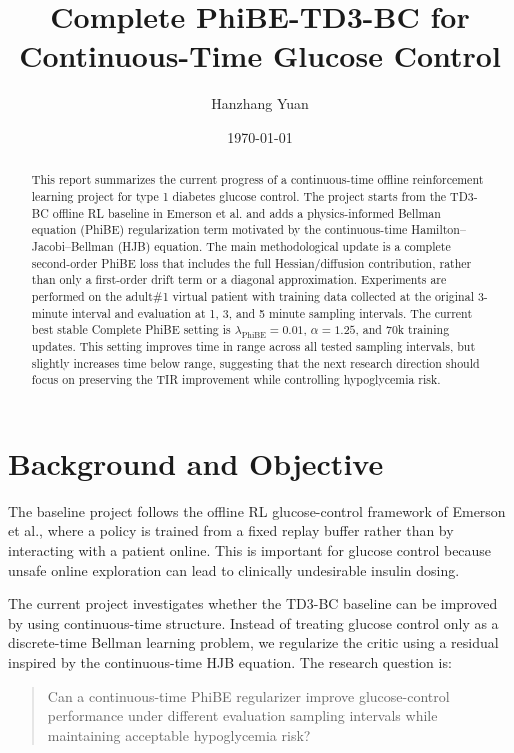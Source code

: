 \documentclass[11pt]{article}
\title{Complete PhiBE-TD3-BC for Continuous-Time Glucose Control}
\author{Hanzhang Yuan}
\date{\today}
\begin{document}
\maketitle

\begin{abstract}
This report summarizes the current progress of a continuous-time offline reinforcement
learning project for type 1 diabetes glucose control. The project starts from the TD3-BC
offline RL baseline in Emerson et al. and adds a physics-informed Bellman equation
(PhiBE) regularization term motivated by the continuous-time Hamilton--Jacobi--Bellman
(HJB) equation. The main methodological update is a complete second-order PhiBE loss
that includes the full Hessian/diffusion contribution, rather than only a first-order drift
term or a diagonal approximation. Experiments are performed on the adult\#1 virtual
patient with training data collected at the original 3-minute interval and evaluation at
1, 3, and 5 minute sampling intervals. The current best stable Complete PhiBE setting is
\(\lambda_{\mathrm{PhiBE}}=0.01\), \(\alpha=1.25\), and 70k training updates. This setting
improves time in range across all tested sampling intervals, but slightly increases time
below range, suggesting that the next research direction should focus on preserving the
TIR improvement while controlling hypoglycemia risk.
\end{abstract}

\section{Background and Objective}

The baseline project follows the offline RL glucose-control framework of Emerson et al.,
where a policy is trained from a fixed replay buffer rather than by interacting with a
patient online. This is important for glucose control because unsafe online exploration
can lead to clinically undesirable insulin dosing.

The current project investigates whether the TD3-BC baseline can be improved by using
continuous-time structure. Instead of treating glucose control only as a discrete-time
Bellman learning problem, we regularize the critic using a residual inspired by the
continuous-time HJB equation. The research question is:

\begin{quote}
Can a continuous-time PhiBE regularizer improve glucose-control performance under
different evaluation sampling intervals while maintaining acceptable hypoglycemia risk?
\end{quote}
\end{document}
